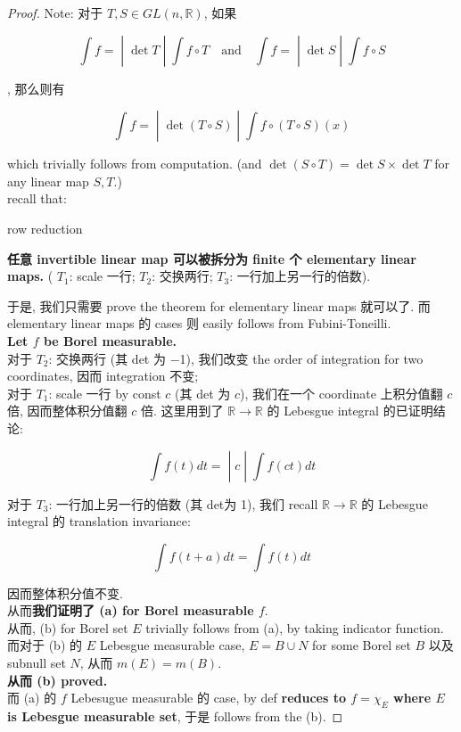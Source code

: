 \documentclass{qlnotes-export}
\begin{document}
\begin{proof}

Note: 对于 \(T,S \in GL(n,{\mathbb{R}})\), 如果

\[\left. \int f = \middle| \det T \middle| \int f \circ T\quad\text{and}\quad\int f = \middle| \det S \middle| \int f \circ S \right.\]

, 那么则有

\[\left. \int f = \middle| \det(T \circ S) \middle| \int f \circ (T \circ S)(x) \right.\]

which trivially follows from computation. (and \(\det(S \circ T) = \det S \times \det T\) for any linear map \(S,T\).)\\
recall that:

\begin{lemma}{row reduction}\label{lem-07-lebesgue-measure-on-r-n-row-reduction}

\textbf{任意 invertible linear map 可以被拆分为 finite 个 elementary linear maps.} ( \(T_{1}\): scale 一行; \(T_{2}\): 交换两行; \(T_{3}\): 一行加上另一行的倍数).

\end{lemma}

于是, 我们只需要 prove the theorem for elementary linear maps 就可以了. 而 elementary linear maps 的 cases 则 easily follows from Fubini-Toneilli.\\
\textbf{Let \(f\) be Borel measurable.}\\
对于 \(T_{2}\): 交换两行 (其 det 为 −1), 我们改变 the order of integration for two coordinates, 因而 integration 不变;\\
对于 \(T_{1}\): scale 一行 by const \(c\) (其 det 为 \(c\)), 我们在一个 coordinate 上积分值翻 \(c\) 倍, 因而整体积分值翻 \(c\) 倍. 这里用到了 \({\mathbb{R}}\rightarrow{\mathbb{R}}\) 的 Lebesgue integral 的已证明结论:

\[\left. \int f(t) dt = \middle| c \middle| \int f(ct) dt \right.\]

对于 \(T_{3}\): 一行加上另一行的倍数 (其 det为 1), 我们 recall \({\mathbb{R}}\rightarrow{\mathbb{R}}\) 的 Lebesgue integral 的 translation invariance:

\[\int f(t + a) dt = \int f(t) dt\]

因而整体积分值不变.\\
从而\textbf{我们证明了 (a) for Borel measurable \(f\)}.\\
从而, (b) for Borel set \(E\) trivially follows from (a), by taking indicator function.\\
而对于 (b) 的 \(E\) Lebesgue measurable case, \(E = B \cup N\) for some Borel set \(B\) 以及 subnull set \(N\), 从而 \(m(E) = m(B)\).\\
\textbf{从而 (b) proved.}\\
而 (a) 的 \(f\) Lebesugue measurable 的 case, by def \textbf{reduces to \(f = \chi_{E}\) where \(E\) is Lebesgue measurable set}, 于是 follows from the (b).

\end{proof}
\end{document}
